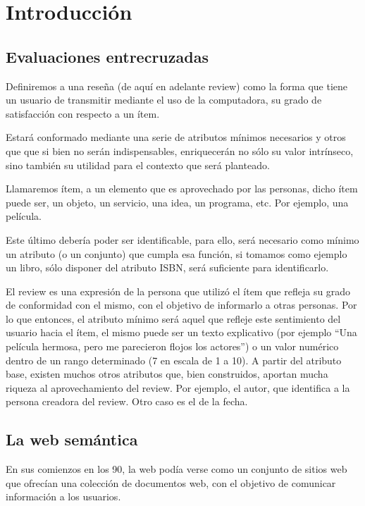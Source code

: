 \chapter{Introducción}
\label{chapter:introduccion}

\section{Evaluaciones entrecruzadas}
\label{section:evaluaciones-cruzadas}
Definiremos a una reseña (de aquí en adelante review) como la forma que tiene un usuario de transmitir mediante el uso de la computadora, su grado de satisfacción con respecto a un ítem. 

Estará conformado mediante una serie de atributos mínimos necesarios y otros que que si bien no serán indispensables, enriquecerán no sólo su valor intrínseco, sino también su utilidad para el contexto que será planteado.


Llamaremos ítem, a un elemento que es aprovechado por las personas, dicho ítem puede ser, un objeto, un servicio, una idea, un programa, etc.  Por ejemplo, una película.

Este último debería poder ser identificable, para ello, será necesario como mínimo un atributo (o un conjunto) que cumpla esa función,  si tomamos como ejemplo un libro, sólo disponer del atributo ISBN, será suficiente para identificarlo.


El review es una expresión de la persona que utilizó el ítem que refleja su grado de conformidad con el mismo, con el objetivo de informarlo a otras personas. Por lo que entonces, el atributo mínimo será aquel que refleje este sentimiento del usuario hacia el ítem, el mismo puede ser un texto explicativo (por ejemplo ``Una película hermosa, pero me parecieron flojos los actores'') o un valor numérico dentro de un rango determinado (7 en escala de 1 a 10).
A partir del atributo base, existen muchos otros atributos que, bien construidos, aportan mucha riqueza al aprovechamiento del review. Por ejemplo, el autor, que identifica a la persona creadora del review. Otro caso es el de la fecha.


\section{La web semántica}
\label{section:la-web-semantica}

En sus comienzos en los 90, la web podía verse como un conjunto de sitios web que ofrecían una colección de documentos web, con el objetivo de comunicar información a los usuarios.

